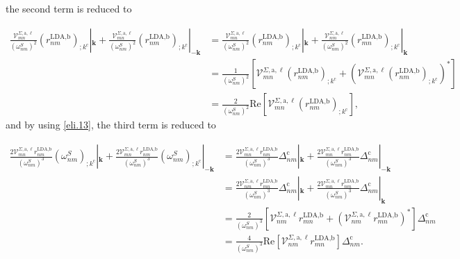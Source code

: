 the second term is reduced to

\begin{align}\label{second_term_gen_deriv}
\frac{\mathcal{V}^{\Sigma,\text{a},\ell}_{mn}}{(\omega^{S}_{nm})^{2}}\left(r^{\text{LDA,b}}_{nm}\right)_{;k^{\text{c}}}|_{\mathbf{k}} + \frac{\mathcal{V}^{\Sigma,\text{a},\ell}_{mn}}{(\omega^{S}_{nm})^{2}}\left(r^{\text{LDA,b}}_{nm}\right)_{;k^{\text{c}}}|_{-\mathbf{k}}
&= \frac{\mathcal{V}^{\Sigma,\text{a},\ell}_{mn}}{(\omega^{S}_{nm})^{2}}\left(r^{\text{LDA,b}}_{nm}\right)_{;k^{\text{c}}}|_{\mathbf{k}} + \frac{\mathcal{V}^{\Sigma,\text{a},\ell}_{nm}}{(\omega^{S}_{nm})^{2}}\left(r^{\text{LDA,b}}_{mn}\right)_{;k^{\text{c}}}|_{\mathbf{k}}\nonumber\\
&= \frac{1}{(\omega^{S}_{nm})^{2}}\left[\mathcal{V}^{\Sigma,\text{a},\ell}_{mn}\left(r^{\text{LDA,b}}_{nm}\right)_{;k^{\text{c}}} + \left(\mathcal{V}^{\Sigma,\text{a},\ell}_{mn}\left(r^{\text{LDA,b}}_{nm}\right)_{;k^{\text{c}}}\right)^*\right]\nonumber\\
&= \frac{2}{(\omega^{S}_{nm})^{2}}\mathrm{Re}\left[\mathcal{V}^{\Sigma,\text{a},\ell}_{mn}\left(r^{\text{LDA,b}}_{nm}\right)_{;k^{\text{c}}}\right],
\end{align}
and by using \eqref{eli.13}, the third term is reduced to

\begin{align}\label{third_term_gen_deriv}
\frac{2\mathcal{V}^{\Sigma,\text{a},\ell}_{mn}r^{\text{LDA,b}}_{nm}}{(\omega^{S}_{nm})^{3}}\left(\omega^{S}_{nm}\right)_{;k^{\text{c}}}|_{\mathbf{k}} + \frac{2\mathcal{V}^{\Sigma,\text{a},\ell}_{mn}r^{\text{LDA,b}}_{nm}}{(\omega^{S}_{nm})^{3}}\left(\omega^{S}_{nm}\right)_{;k^{\text{c}}}|_{-\mathbf{k}}
&= \frac{2\mathcal{V}^{\Sigma,\text{a},\ell}_{mn}r^{\text{LDA,b}}_{nm}}{(\omega^{S}_{nm})^{3}}\Delta_{nm}^{\text{c}}|_{\mathbf{k}} + \frac{2\mathcal{V}^{\Sigma,\text{a},\ell}_{mn}r^{\text{LDA,b}}_{nm}}{(\omega^{S}_{nm})^{3}}\Delta_{nm}^{\text{c}}|_{-\mathbf{k}}\nonumber\\
&= \frac{2\mathcal{V}^{\Sigma,\text{a},\ell}_{nm}r^{\text{LDA,b}}_{mn}}{(\omega^{S}_{nm})^{3}}\Delta_{nm}^{\text{c}}|_{\mathbf{k}} + \frac{2\mathcal{V}^{\Sigma,\text{a},\ell}_{mn}r^{\text{LDA,b}}_{nm}}{(\omega^{S}_{nm})^{3}}\Delta_{nm}^{\text{c}}|_{\mathbf{k}}\nonumber\\
&= \frac{2}{(\omega^{S}_{nm})^{3}}\left[\mathcal{V}^{\Sigma,\text{a},\ell}_{nm}r^{\text{LDA,b}}_{mn} + \left(\mathcal{V}^{\Sigma,\text{a},\ell}_{nm}r^{\text{LDA,b}}_{mn}\right)^{*}\right]\Delta_{nm}^{\text{c}}\nonumber\\
&= \frac{4}{(\omega^{S}_{nm})^{3}}\mathrm{Re}\left[\mathcal{V}^{\Sigma,\text{a},\ell}_{nm}r^{\text{LDA,b}}_{mn}\right]\Delta_{nm}^{\text{c}}.
\end{align}

